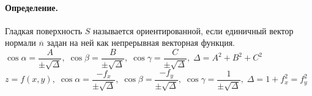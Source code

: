 \paragraph{Определение.} Гладкая поверхность $ S $ называется ориентированной, если единичный вектор нормали $ \overline{n} $ задан на ней как непрерывная векторная функция.\\
$ \cos \alpha = \dfrac{A}{\pm\sqrt{\Delta}},\; \cos \beta = \dfrac{B}{\pm\sqrt{\Delta}},\; \cos \gamma = \dfrac{C}{\pm\sqrt{\Delta}},\; \Delta = A^2 + B^2 + C^2 $\\[0.5em]
$ z = f(x,y),\; \cos \alpha =\dfrac{-f_x}{\pm\sqrt{\Delta}},\; \cos \beta = \dfrac{-f_y}{\pm\sqrt{\Delta}},\; \cos \gamma = \dfrac{1}{\pm\sqrt{\Delta}},\; \Delta = 1 + f_x^2 =f_y^2 $	
